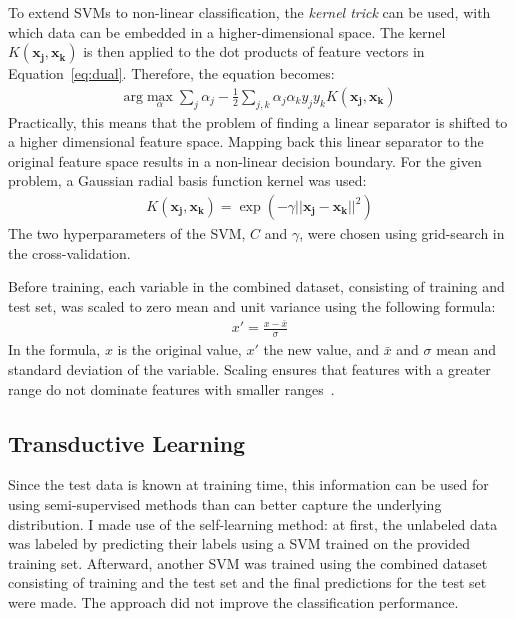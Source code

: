 \documentclass[a4paper,11pt]{article}
\begin{document}
To extend SVMs to non-linear classification, the \emph{kernel trick}
can be used, with which data can be embedded in a higher-dimensional
space. The kernel $K(\mathbf{x_j}, \mathbf{x_k})$ is then applied to
the dot products of feature vectors in
Equation~\ref{eq:dual}. Therefore, the equation becomes:
\begin{align}
\label{eq:dualkernel}
  \text{arg}\max_\alpha\sum_j\alpha_j - \frac{1}{2}\sum_{j,k}\alpha_j\alpha_ky_jy_kK(\mathbf{x_j}, \mathbf{x_k})
\end{align} 
Practically, this means that the problem of finding a linear separator
is shifted to a higher dimensional feature space. Mapping back this
linear separator to the original feature space results in a non-linear
decision boundary.  For the given problem, a Gaussian radial basis
function kernel was used:
\begin{align}
K(\mathbf{x_j}, \mathbf{x_k}) = \exp(-\gamma||\mathbf{x_j} - \mathbf{x_k} ||^2)
\end{align}
The two hyperparameters of the SVM, $C$ and
$\gamma$,  were chosen using grid-search in the cross-validation.


Before training, each variable in the combined dataset, consisting of
training and test set, was scaled to zero mean and unit variance using
the following formula:
\begin{align}
  x' = \frac{x - \bar{x}}{\sigma}
\end{align}
In the formula, $x$ is the original value, $x'$ the new value, and
$\bar{x}$ and $\sigma$ mean and standard deviation of the
variable. Scaling ensures that features with a greater range do not
dominate features with smaller ranges~\cite{hsu2003practical}.

\subsection{Transductive Learning}

Since the test data is known at training time, this information can be
used for using semi-supervised methods than can better capture the
underlying distribution. I made use of the self-learning method: at
first, the unlabeled data was labeled by predicting their labels using
a SVM trained on the provided training set. Afterward, another SVM was
trained using the combined dataset consisting of training and the test
set and the final predictions for the test set were made. The approach
did not improve the classification performance.
\end{document}
